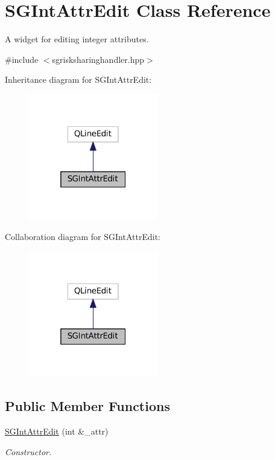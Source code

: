 \hypertarget{classSGIntAttrEdit}{}\section{S\+G\+Int\+Attr\+Edit Class Reference}
\label{classSGIntAttrEdit}


A widget for editing integer attributes.  




{\ttfamily \#include $<$sgrisksharinghandler.\+hpp$>$}



Inheritance diagram for S\+G\+Int\+Attr\+Edit\+:
\nopagebreak
\begin{figure}[H]
\begin{center}
\leavevmode
\includegraphics[width=160pt]{classSGIntAttrEdit__inherit__graph}
\end{center}
\end{figure}


Collaboration diagram for S\+G\+Int\+Attr\+Edit\+:
\nopagebreak
\begin{figure}[H]
\begin{center}
\leavevmode
\includegraphics[width=160pt]{classSGIntAttrEdit__coll__graph}
\end{center}
\end{figure}
\subsection*{Public Member Functions}
\begin{DoxyCompactItemize}
\item 
\mbox{\label{classSGIntAttrEdit_a83831c89273f82b5ab2d44fac2f3c970}} 
\hyperlink{classSGIntAttrEdit_a83831c89273f82b5ab2d44fac2f3c970}{S\+G\+Int\+Attr\+Edit} (int \&\+\_\+attr)
\begin{DoxyCompactList}\small\item\em Constructor. \end{DoxyCompactList}\end{DoxyCompactItemize}
